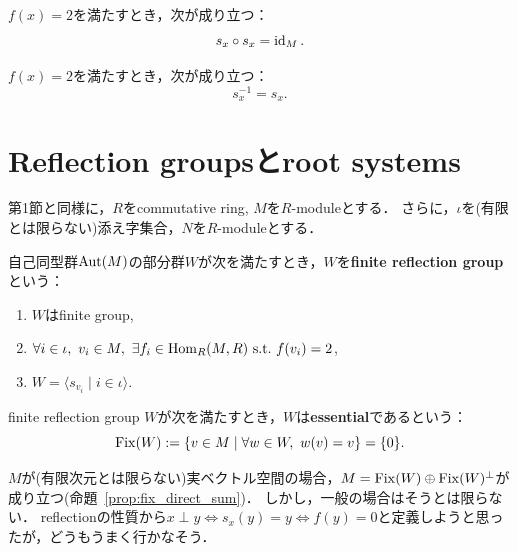 \begin{lemma}
  \label{lem:Module.involutive_reflection}
  \leanok
  $f(x) = 2$を満たすとき，次が成り立つ：
  \begin{equation}
    s_x \circ s_x = \operatorname{id}_M.
  \end{equation}
\end{lemma}

\begin{lemma}
  \label{lem:Module.reflection_inv}
  \leanok
  $f(x) = 2$を満たすとき，次が成り立つ：
  \begin{equation}
    s_x^{-1} = s_x.
  \end{equation}
\end{lemma}

\section{Reflection groupsとroot systems}
第1節と同様に，$R$をcommutative ring, $M$を$R$-moduleとする．
さらに，$\iota$を(有限とは限らない)添え字集合，$N$を$R$-moduleとする．

\begin{definition}
  \label{defi:FiniteReflectionGroup}
  \leanok
  自己同型群$\operatorname{Aut}(M)$の部分群$W$が次を満たすとき，$W$を\textbf{finite reflection group}という：
  \begin{enumerate}[label=(\roman*)]
    \item $W$はfinite group,
    \item $\forall i \in \iota,\ v_i \in M,\ \exists f_i \in \Hom_R(M, R) \st f(v_i) = 2$,
    \item $W = \langle s_{v_i} \mid i \in \iota \rangle$.
  \end{enumerate}
\end{definition}

\begin{definition}
  \label{defi:essFRG}
  \leanok
  finite reflection group $W$が次を満たすとき，$W$は\textbf{essential}であるという：
  \begin{equation}
    \Fix(W) := \set{v \in M}{\forall w \in W,\ w(v) = v} = \{0\}.
  \end{equation}
\end{definition}

\begin{remark}
  $M$が(有限次元とは限らない)実ベクトル空間の場合，$M = \operatorname{Fix}(W) \oplus \operatorname{Fix}(W)^\perp$が成り立つ(命題~\ref{prop:fix_direct_sum})．
  しかし，一般の場合はそうとは限らない．
  reflectionの性質から$x \perp y \iff s_x(y) = y \iff f(y) = 0$と定義しようと思ったが，どうもうまく行かなそう．
\end{remark}

